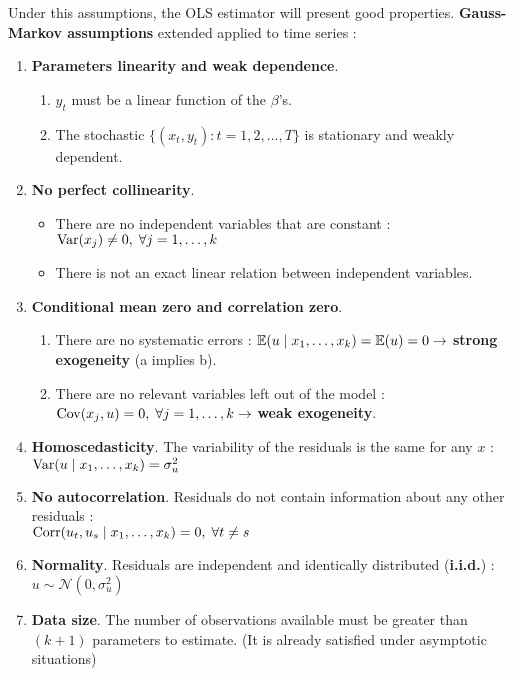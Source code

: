  \begin{f}

Under this assumptions, the OLS estimator will present good properties. \textbf{Gauss-Markov assumptions} extended applied to time series :

\begin{enumerate}[leftmargin=*, label=t\arabic{*}.]
	\item \textbf{Parameters linearity and weak dependence}.
	
	\begin{enumerate}[leftmargin=*, label=\alph{*}.]
		\item $y_{t}$ must be a linear function of the $\beta$'s.
		\item The stochastic $\lbrace( x_{t}, y_{t}) : t = 1, 2, \ldots, T \rbrace$ is stationary and weakly dependent.
	\end{enumerate}
	
	\item \textbf{No perfect collinearity}.
	
	\begin{itemize}[leftmargin=*]
		\item There are no independent variables that are constant : $\mathrm{Var}(x_{j}) \neq 0, \; \forall j = 1, \ldots, k$
		\item There is not an exact linear relation between independent variables.
	\end{itemize}
	
	\item \textbf{Conditional mean zero and correlation zero}.
	
	\begin{enumerate}[leftmargin=*, label=\alph{*}.]
		\item There are no systematic errors : $\mathbb{E}(u \mid x_{1}, \ldots, x_{k}) = \mathbb{E}(u) = 0 \rightarrow$ \textbf{strong exogeneity} (a implies b).
		\item There are no relevant variables left out of the model : $\mathrm{Cov}(x_{j} , u) = 0, \; \forall j = 1, \ldots, k \rightarrow$ \textbf{weak exogeneity}.
	\end{enumerate}
	
	\item \textbf{Homoscedasticity}. The variability of the residuals is the same for any $x$ : $\mathrm{Var}(u \mid x_{1}, \ldots, x_{k}) = \sigma^{2}_{u}$
	\item \textbf{No autocorrelation}. Residuals do not contain information about any other residuals : \\
	$\mathrm{Corr}(u_{t}, u_{s} \mid x_{1}, \ldots, x_{k}) = 0, \; \forall t \neq s$
	\item \textbf{Normality}. Residuals are independent and identically distributed (\textbf{i.i.d.}) : $u \sim \mathcal{N}(0, \sigma^{2}_{u})$
	\item \textbf{Data size}. The number of observations available must be greater than $(k + 1)$ parameters to estimate. (It is already satisfied under asymptotic situations)
\end{enumerate}

\end{f}    

